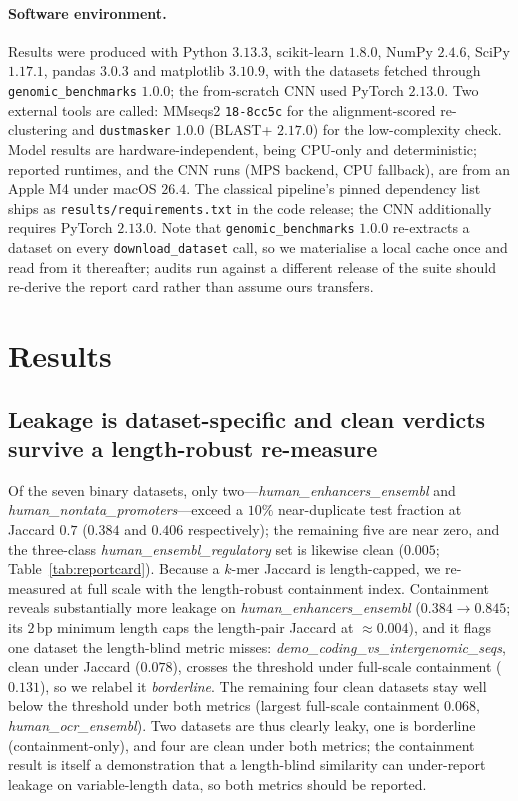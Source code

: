 \documentclass[webpdf,modern,large,namedate]{oup-authoring-template}%
\begin{document}
\paragraph{Software environment.} Results were produced with Python $3.13.3$, scikit-learn $1.8.0$, NumPy $2.4.6$, SciPy $1.17.1$, pandas $3.0.3$ and matplotlib $3.10.9$, with the datasets fetched through \texttt{genomic\_benchmarks} $1.0.0$; the from-scratch CNN used PyTorch $2.13.0$. Two external tools are called: MMseqs2 \texttt{18-8cc5c} for the alignment-scored re-clustering and \texttt{dustmasker} $1.0.0$ (BLAST+ $2.17.0$) for the low-complexity check. Model results are hardware-independent, being CPU-only and deterministic; reported runtimes, and the CNN runs (MPS backend, CPU fallback), are from an Apple M4 under macOS $26.4$. The classical pipeline's pinned dependency list ships as \texttt{results/requirements.txt} in the code release; the CNN additionally requires PyTorch $2.13.0$. Note that \texttt{genomic\_benchmarks} $1.0.0$ re-extracts a dataset on every \texttt{download\_dataset} call, so we materialise a local cache once and read from it thereafter; audits run against a different release of the suite should re-derive the report card rather than assume ours transfers.

\section{Results}

\subsection{Leakage is dataset-specific and clean verdicts survive a length-robust re-measure}
Of the seven binary datasets, only two---\textit{human\_enhancers\_ensembl} and \textit{human\_nontata\_promoters}---exceed a $10\%$ near-duplicate test fraction at Jaccard $0.7$ ($0.384$ and $0.406$ respectively); the remaining five are near zero, and the three-class \textit{human\_ensembl\_regulatory} set is likewise clean ($0.005$; Table~\ref{tab:reportcard}). Because a $k$-mer Jaccard is length-capped, we re-measured at full scale with the length-robust containment index. Containment reveals substantially more leakage on \textit{human\_enhancers\_ensembl} ($0.384\to0.845$; its $2$\,bp minimum length caps the length-pair Jaccard at $\approx0.004$), and it flags one dataset the length-blind metric misses: \textit{demo\_coding\_vs\_intergenomic\_seqs}, clean under Jaccard ($0.078$), crosses the threshold under full-scale containment ($0.131$), so we relabel it \emph{borderline}. The remaining four clean datasets stay well below the threshold under both metrics (largest full-scale containment $0.068$, \textit{human\_ocr\_ensembl}). Two datasets are thus clearly leaky, one is borderline (containment-only), and four are clean under both metrics; the containment result is itself a demonstration that a length-blind similarity can under-report leakage on variable-length data, so both metrics should be reported.
\end{document}
